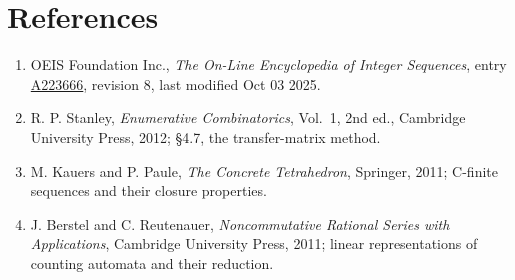 \documentclass[11pt]{article}
\theoremstyle{definition}
\begin{document}
\section{References}

\begin{enumerate}

\item OEIS Foundation Inc., \emph{The On-Line Encyclopedia of Integer Sequences}, entry \href{https://oeis.org/A223666}{A223666}, revision 8, last modified Oct 03 2025.

\item R. P. Stanley, \emph{Enumerative Combinatorics}, Vol.~1, 2nd ed., Cambridge University Press, 2012; \S4.7, the transfer-matrix method.

\item M. Kauers and P. Paule, \emph{The Concrete Tetrahedron}, Springer, 2011; C-finite sequences and their closure properties.

\item J. Berstel and C. Reutenauer, \emph{Noncommutative Rational Series with Applications}, Cambridge University Press, 2011; linear representations of counting automata and their reduction.

\end{enumerate}
\end{document}
